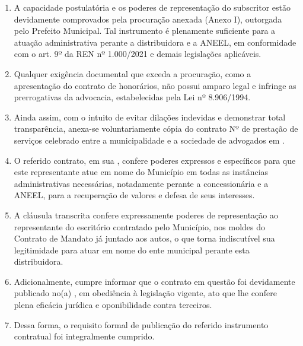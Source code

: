 \begin{enumerate}[resume]
\item A capacidade postulatória e os poderes de representação do subscritor estão devidamente comprovados pela procuração anexada (Anexo I), outorgada pelo Prefeito Municipal. Tal instrumento é plenamente suficiente para a atuação administrativa perante a distribuidora e a ANEEL, em conformidade com o art. 9º da REN nº 1.000/2021 e demais legislações aplicáveis.
\item Qualquer exigência documental que exceda a procuração, como a apresentação do contrato de honorários, não possui amparo legal e infringe as prerrogativas da advocacia, estabelecidas pela Lei nº 8.906/1994.
\item Ainda assim, com o intuito de evitar dilações indevidas e demonstrar total transparência, anexa-se voluntariamente cópia do contrato Nº \numeroContrato{} de prestação de serviços celebrado entre a municipalidade e a sociedade de advogados em \dataPublicacao{}.
\item O referido contrato, em sua \textbf{\tituloClausula{}}, confere poderes expressos e específicos para que este representante atue em nome do Município em todas as instâncias administrativas necessárias, notadamente perante a concessionária e a ANEEL, para a recuperação de valores e defesa de seus interesses.
\Citacao{\clausula{}}
\item A cláusula transcrita confere expressamente poderes de representação ao representante do escritório contratado pelo Município, nos moldes do Contrato de Mandato já juntado aos autos, o que torna indiscutível sua legitimidade para atuar em nome do ente municipal perante esta distribuidora.
\item Adicionalmente, cumpre informar que o contrato em questão foi devidamente publicado no(a) \textbf{\publicacao{}}, em obediência à legislação vigente, ato que lhe confere plena eficácia jurídica e oponibilidade contra terceiros.
\item Dessa forma, o requisito formal de publicação do referido instrumento contratual foi integralmente cumprido. 
\end{enumerate}

